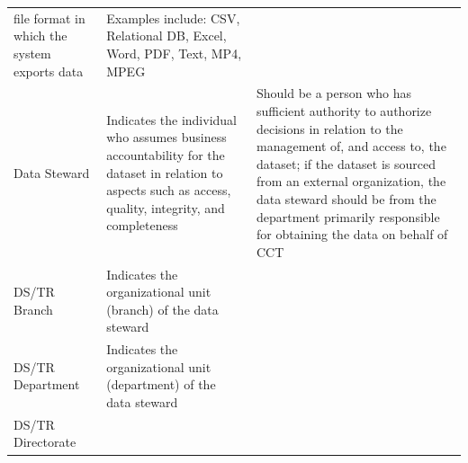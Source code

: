 \documentclass[
]{WileySix}
\begin{document}
\begin{longtable}[]{@{}lll@{}}
\begin{minipage}[t]{0.35\columnwidth}
file format in which the
system exports data\strut
\end{minipage} & \begin{minipage}[t]{0.35\columnwidth}\raggedright
Examples include: CSV,
Relational DB, Excel,
Word, PDF, Text, MP4,
MPEG\strut
\end{minipage}\tabularnewline
\begin{minipage}[t]{0.22\columnwidth}\raggedright
Data Steward\strut
\end{minipage} & \begin{minipage}[t]{0.35\columnwidth}\raggedright
Indicates the individual
who assumes business
accountability for the
dataset in relation to
aspects such as access,
quality, integrity, and
completeness\strut
\end{minipage} & \begin{minipage}[t]{0.35\columnwidth}\raggedright
Should be a person who
has sufficient authority
to authorize decisions in
relation to the
management of, and access
to, the dataset; if the
dataset is sourced from
an external organization,
the data steward should
be from the department
primarily responsible for
obtaining the data on
behalf of CCT\strut
\end{minipage}\tabularnewline
\begin{minipage}[t]{0.22\columnwidth}\raggedright
DS/TR Branch\strut
\end{minipage} & \begin{minipage}[t]{0.35\columnwidth}\raggedright
Indicates the
organizational unit
(branch) of the data
steward\strut
\end{minipage} & \begin{minipage}[t]{0.35\columnwidth}\raggedright
\strut
\end{minipage}\tabularnewline
\begin{minipage}[t]{0.22\columnwidth}\raggedright
DS/TR
Department\strut
\end{minipage} & \begin{minipage}[t]{0.35\columnwidth}\raggedright
Indicates the
organizational unit
(department) of the data
steward\strut
\end{minipage} & \begin{minipage}[t]{0.35\columnwidth}\raggedright
\strut
\end{minipage}\tabularnewline
\begin{minipage}[t]{0.22\columnwidth}\raggedright
DS/TR
Directorate\strut
\end{minipage} & \begin{minipage}[t]{0.35\columnwidth}\raggedright

\end{minipage}
\end{longtable}
\end{document}
